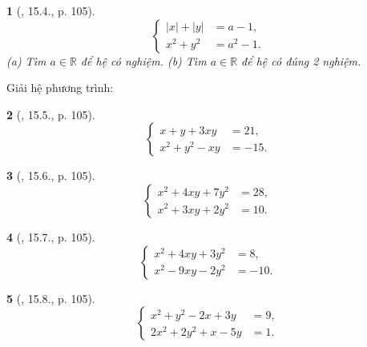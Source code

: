 \documentclass{article}
\newtheorem{baitoan}{}
\begin{document}
\begin{baitoan}[\cite{TLCT_THCS_Toan_9_dai_so}, 15.4., p. 105]
	\begin{equation*}
		\left\{\begin{split}
			|x| + |y| &= a - 1,\\
			x^2 + y^2 &= a^2 - 1.
		\end{split}\right.
	\end{equation*}
	(a) Tìm $a\in\mathbb{R}$ để hệ có nghiệm. (b) Tìm $a\in\mathbb{R}$ để hệ có đúng 2 nghiệm.
\end{baitoan}
Giải hệ phương trình:

\begin{baitoan}[\cite{TLCT_THCS_Toan_9_dai_so}, 15.5., p. 105]
	\begin{equation*}
		\left\{\begin{split}
			x + y + 3xy &= 21,\\
			x^2 + y^2 - xy &= -15.
		\end{split}\right.
	\end{equation*}
\end{baitoan}

\begin{baitoan}[\cite{TLCT_THCS_Toan_9_dai_so}, 15.6., p. 105]
	\begin{equation*}
		\left\{\begin{split}
			x^2 + 4xy + 7y^2 &= 28,\\
			x^2 + 3xy + 2y^2 &= 10.
		\end{split}\right.
	\end{equation*}
\end{baitoan}

\begin{baitoan}[\cite{TLCT_THCS_Toan_9_dai_so}, 15.7., p. 105]
	\begin{equation*}
		\left\{\begin{split}
			x^2 + 4xy + 3y^2 &= 8,\\
			x^2 - 9xy - 2y^2 &= -10.
		\end{split}\right.
	\end{equation*}
\end{baitoan}

\begin{baitoan}[\cite{TLCT_THCS_Toan_9_dai_so}, 15.8., p. 105]
	\begin{equation*}
		\left\{\begin{split}
			x^2 + y^2 - 2x + 3y &= 9,\\
			2x^2 + 2y^2 + x - 5y &= 1.
		\end{split}\right.
	\end{equation*}
\end{baitoan}
\end{document}
